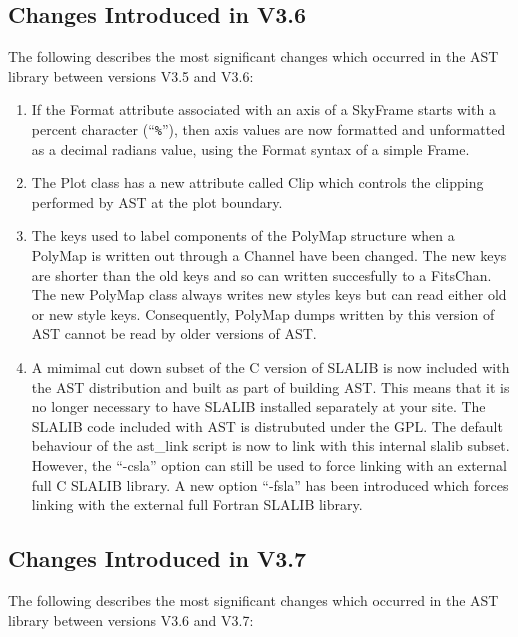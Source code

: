 \documentclass[twoside,11pt]{article}
\begin{document}
\subsection{Changes Introduced in V3.6}

The following describes the most significant changes which
occurred in the AST library between versions V3.5 and V3.6:

\begin{enumerate}

\item If the Format attribute associated with an axis of a SkyFrame
starts with a percent character (``\verb+%+''), then axis values are
now formatted and unformatted as a decimal radians value, using the
Format syntax of a simple Frame.

\item The Plot class has a new attribute called Clip which controls the
clipping performed by AST at the plot boundary.

\item The keys used to label components of the PolyMap structure when a
PolyMap is written out through a Channel have been changed. The new keys
are shorter than the old keys and so can written succesfully to a FitsChan.
The new PolyMap class always writes new styles keys but can read either
old or new style keys. Consequently, PolyMap dumps written by this
version of AST cannot be read by older versions of AST.

\item A mimimal cut down subset of the C version of SLALIB is now
included with the AST distribution and built as part of building AST.
This means that it is no longer necessary to have SLALIB installed
separately at your site. The SLALIB code included with AST is distrubuted
under the GPL. The default behaviour of the ast\_link script is now to
link with this internal slalib subset. However, the ``-csla'' option can
still be used to force linking with an external full C SLALIB library.
A new option ``-fsla'' has been introduced which forces linking with the
external full Fortran SLALIB library.

\end{enumerate}

\subsection{Changes Introduced in V3.7}

The following describes the most significant changes which
occurred in the AST library between versions V3.6 and V3.7:
\end{document}
